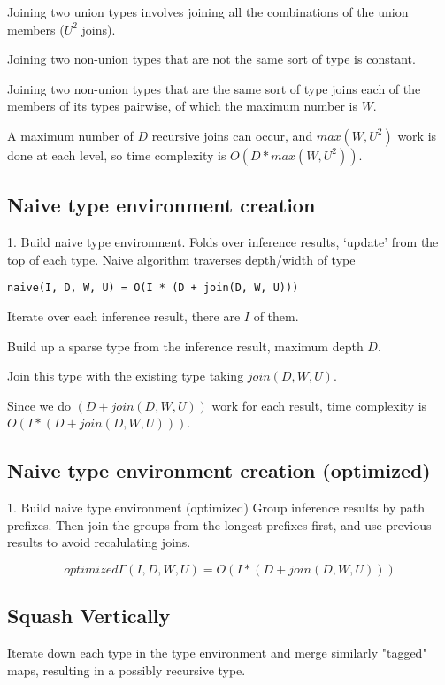 Joining two union types involves joining all the combinations of the union members ($U^2$ joins).

Joining two non-union types that are not the same sort of type is constant.

Joining two non-union types that are the same sort of type joins
each of the members of its types pairwise, of which the maximum number is $W$.

A maximum number of $D$ recursive joins can occur, and $max(W, U^2)$ work is done
at each level, so time complexity is $O(D * max(W, U^2))$.

\subsection{Naive type environment creation}
\label{naive-gamma-slow}

1. Build naive type environment.
   Folds over inference results, `update' from the top of each type.
   Naive algorithm traverses depth/width of type 

\begin{verbatim}
naive(I, D, W, U) = O(I * (D + join(D, W, U)))
\end{verbatim}

Iterate over each inference result, there are $I$ of them.

Build up a sparse type from the inference result, maximum depth $D$.

Join this type with the existing type taking $join(D, W, U)$.

Since we do $(D + join(D, W, U))$ work for each result, time complexity
is $O(I * (D + join(D, W, U)))$.

\subsection{Naive type environment creation (optimized)}
\label{naive-gamma-fast}

1. Build naive type environment (optimized)
  Group inference results by path prefixes. Then join the groups
  from the longest prefixes first, and use previous results to avoid
  recalulating joins.

\[
optimized\Gamma(I, D, W, U) = O(I * (D + join(D, W, U)))
\]

\subsection{Squash Vertically}
\label{squash-vertically}
Iterate down each type in the type environment and merge similarly "tagged"
maps, resulting in a possibly recursive type.

